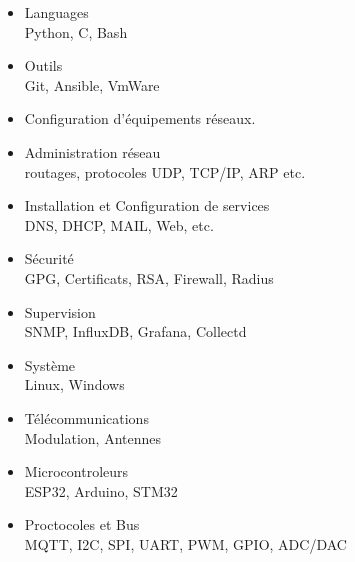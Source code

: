 



















\begin{itemize}
    \item Languages\\
         Python, C, Bash
    \item Outils\\
        Git, Ansible, VmWare
    
\end{itemize}{}


\begin{itemize}
    \item Configuration d'équipements réseaux.
    \item Administration réseau\\
    routages, protocoles UDP, TCP/IP, ARP etc.
    \item Installation et Configuration de services\\
    DNS, DHCP, MAIL, Web, etc. 
    \item Sécurité \\
    GPG, Certificats, RSA, Firewall, Radius
    \item Supervision\\
    SNMP, InfluxDB, Grafana, Collectd
    \item Système\\
    Linux, Windows
\end{itemize}



\begin{itemize}
    \item Télécommunications \\
    Modulation, Antennes
    \item Microcontroleurs \\
    ESP32, Arduino, STM32
    \item Proctocoles et Bus  \\
     MQTT, I2C, SPI, UART, PWM, GPIO, ADC/DAC
\end{itemize}





